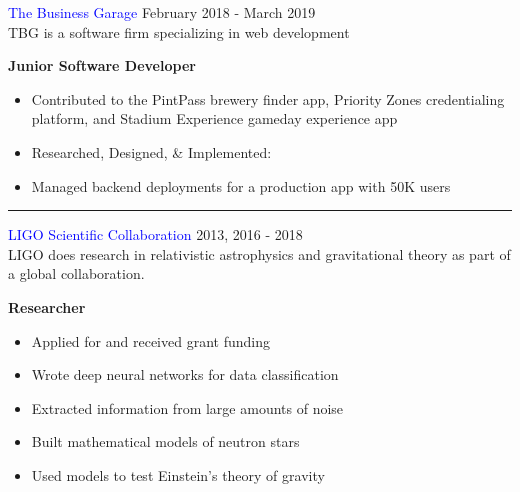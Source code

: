 \documentclass[12pt]{resume}
\begin{document}
\begin{minipage}[t]{0.48\textwidth}
        \textcolor{blue}{The Business Garage} {\hfill February 2018 - March 2019} \\
        TBG is a software firm specializing in web development
        \begin{spacing}{1.2}
            {\bf Junior Software Developer}
        \end{spacing}
        \vspace{-1mm}
        \begin{itemize}
            \setlength\itemsep{.2em}
            \item {Contributed to the PintPass brewery finder app, Priority
                Zones credentialing platform, and Stadium Experience
            gameday experience app}
            \item {Researched, Designed, \& Implemented:}
            \item {Managed backend deployments for a production app with 50K users}
        \end{itemize}

        \vspace{-.5em}
        \rule{\textwidth}{0.1pt}
        \vspace{.1em}

        \textcolor{blue}{LIGO Scientific Collaboration} {\hfill 2013, 2016 - 2018} \\
        LIGO does research in relativistic astrophysics and gravitational
        theory as part of a global collaboration.
        \begin{spacing}{1.2}
            {\bf Researcher}
        \end{spacing}
        \vspace{-1mm}
        \begin{itemize}
            \setlength\itemsep{.2em}
            \item {Applied for and received grant funding}
            \item {Wrote deep neural networks for data classification}
            \item {Extracted information from large amounts of noise}
            \item {Built mathematical models of neutron stars}
            \item {Used models to test Einstein’s theory of gravity}
        \end{itemize}

    \end{minipage}
\end{document}
